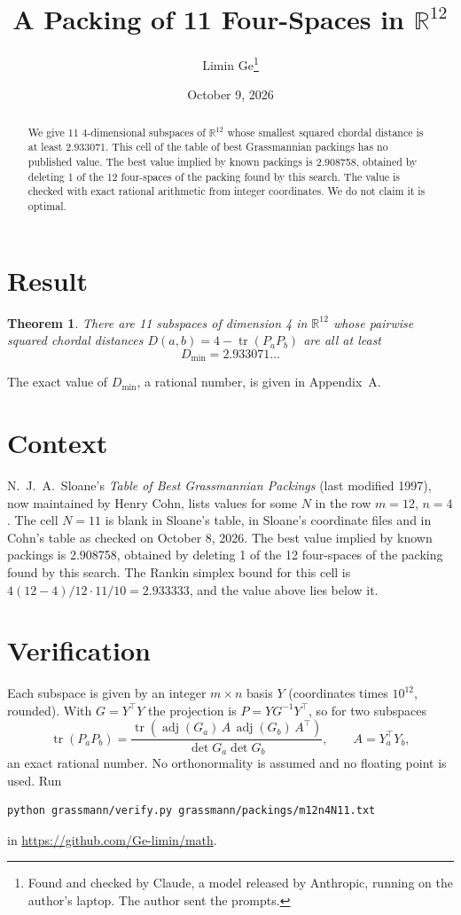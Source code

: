 \documentclass[11pt,a4paper]{article}
\title{A Packing of 11 Four-Spaces in $\mathbb{R}^{12}$}
\author{Limin Ge\thanks{Found and checked by Claude, a model released by Anthropic, running on the author's laptop. The author sent the prompts.}}
\date{October 9, 2026}
\newtheorem*{theorem}{Theorem}
\begin{document}
\maketitle
\begin{abstract}
We give 11 4-dimensional subspaces of $\mathbb{R}^{12}$ whose smallest squared chordal distance is at least 2.933071. This cell of the table of best Grassmannian packings has no published value. The best value implied by known packings is 2.908758, obtained by deleting 1 of the 12 four-spaces of the packing found by this search. The value is checked with exact rational arithmetic from integer coordinates. We do not claim it is optimal.
\end{abstract}

\section{Result}
\begin{theorem}
There are 11 subspaces of dimension 4 in $\mathbb{R}^{12}$ whose pairwise squared chordal distances $D(a,b) = 4 - \operatorname{tr}(P_aP_b)$ are all at least
\[ D_{\min} = 2.933071\ldots \]
\end{theorem}
The exact value of $D_{\min}$, a rational number, is given in Appendix~A.


\section{Context}
N.~J.~A.~Sloane's \emph{Table of Best Grassmannian Packings} (last modified 1997), now maintained by Henry Cohn, lists values for some $N$ in the row $m=12$, $n=4$. The cell $N=11$ is blank in Sloane's table, in Sloane's coordinate files and in Cohn's table as checked on October 8, 2026. The best value implied by known packings is 2.908758, obtained by deleting 1 of the 12 four-spaces of the packing found by this search. The Rankin simplex bound for this cell is $4(12-4)/12\cdot 11/10 = 2.933333$, and the value above lies below it.


\section{Verification}
Each subspace is given by an integer $m\times n$ basis $Y$ (coordinates times $10^{12}$, rounded). With $G=Y^\top Y$ the projection is $P=YG^{-1}Y^\top$, so for two subspaces
\[ \operatorname{tr}(P_aP_b)=\frac{\operatorname{tr}(\operatorname{adj}(G_a)\,A\,\operatorname{adj}(G_b)\,A^\top)}{\det G_a\det G_b},\qquad A=Y_a^\top Y_b, \]
an exact rational number. No orthonormality is assumed and no floating point is used. Run
\begin{verbatim}
python grassmann/verify.py grassmann/packings/m12n4N11.txt
\end{verbatim}
in \url{https://github.com/Ge-limin/math}.
\end{document}
